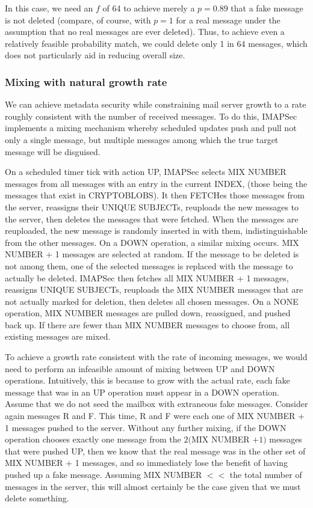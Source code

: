 \documentclass[pageno]{jpaper}
\newcommand{\project}{IMAPSec }
\begin{document}
In this case, we need an $f$ of 64 to achieve merely a $p=0.89$ that a fake message is not deleted (compare, of course, with $p=1$ for a real message under the assumption that no real messages are ever deleted). Thus, to achieve even a relatively feasible probability match, we could delete only 1 in 64 messages, which does not particularly aid in reducing overall size.

\label{natural}
\subsubsection{Mixing with natural growth rate}

We can achieve metadata security while constraining mail server growth to a rate roughly consistent with the number of received messages. To do this, \project implements a mixing mechanism whereby scheduled updates push and pull not only a single message, but multiple messages among which the true target message will be disguised.

On a scheduled timer tick with action UP, \project selects MIX NUMBER messages from all messages with an entry in the current INDEX, (those being the messages that exist in CRYPTOBLOBS). It then FETCHes those messages from the server, reassigns their UNIQUE SUBJECTs, reuploads the new messages to the server, then deletes the messages that were fetched. When the messages are reuploaded, the new message is randomly inserted in with them, indistinguishable from the other messages. On a DOWN operation, a similar mixing occurs. MIX NUMBER + 1 messages are selected at random. If the message to be deleted is not among them, one of the selected messages is replaced with the message to actually be deleted. \project then fetches all MIX NUMBER + 1 messages, reassigns UNIQUE SUBJECTs, reuploads the MIX NUMBER messages that are not actually marked for deletion, then deletes all chosen messages. On a NONE operation, MIX NUMBER messages are pulled down, reassigned, and pushed back up. If there are fewer than MIX NUMBER messages to choose from, all existing messages are mixed.

To achieve a growth rate consistent with the rate of incoming messages, we would need to perform an infeasible amount of mixing between UP and DOWN operations. Intuitively, this is because to grow with the actual rate, each fake message that was in an UP operation must appear in a DOWN operation. Assume that we do not seed the mailbox with extraneous fake messages. Consider again messages R and F. This time, R and F were each one of MIX NUMBER + 1 messages pushed to the server. Without any further mixing, if the DOWN operation chooses exactly one message from the $2($MIX NUMBER $+ 1)$ messages that were pushed UP, then we know that the real message was in the other set of MIX NUMBER + 1 messages, and so immediately lose the benefit of having pushed up a fake message. Assuming MIX NUMBER $<<$ the total number of messages in the server, this will almost certainly be the case given that we must delete something.
\end{document}
